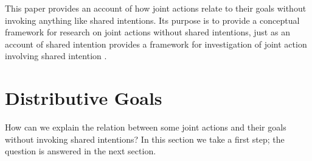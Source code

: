 \documentclass[12pt,a4paper]{extarticle}
\begin{document}
This paper provides an account of how joint actions relate to their goals without invoking anything like shared intentions.  
Its purpose is to provide a conceptual framework for research on joint actions without shared intentions, just as an account of shared intention provides a framework for investigation of joint action involving shared intention \citep[p.\ 150]{Bratman:2009lv}.  






\section{Distributive Goals}
\label{section_distributive}

How can we explain the relation between some joint actions and  their goals without invoking shared intentions?  In this section we take a first step; the question is answered in the next section.
\end{document}
